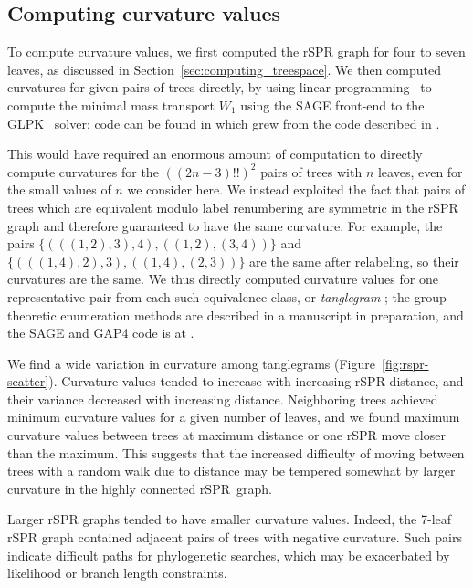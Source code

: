 \documentclass[11pt]{amsart}
\newcommand{\cuttable}[2][]{%
    \ifthenelse{\equal{#1}{}}%
		{}%
		{#1}%
}
\begin{document}
\subsection{Computing curvature values}
To compute curvature values, we first \cuttable[computed]{used \texttt{dense\_spr\_graph} to compute} the rSPR graph for four to seven leaves, as discussed in Section~\ref{sec:computing_treespace}.
We then computed curvatures for given pairs of trees directly, by using linear programming~\cite{Loisel2014-hu} to compute the minimal mass transport $W_1$ using the SAGE \cite{SAGE} front-end to the GLPK~\cite{glpk} solver; code can be found in \cite{gricci} which grew from the code described in \cite{Loisel2014-hu}.

This would have required an enormous amount of computation to directly compute curvatures for the $((2n-3)!!)^2$ pairs of trees with $n$ leaves, even for the small values of $n$ we consider here.
We instead exploited the fact that pairs of trees which are equivalent modulo label renumbering are symmetric in the rSPR graph and therefore guaranteed to have the same curvature.
For example, the pairs
$\{(((1,2),3),4), ((1,2),(3,4))\}$ and
$\{(((1,4),2),3), ((1,4),(2,3))\}$
are the same after relabeling, so their curvatures are the same.
We thus directly computed curvature values for one representative pair from each such equivalence class, or \emph{tanglegram} \cite{Venkatachalam2010-zh}; the group-theoretic enumeration methods are described in a manuscript in preparation, and the SAGE \cite{SAGE} and GAP4 \cite{GAP4} code is at \cite{tangle}.

We find a wide variation in curvature among tanglegrams (Figure~\ref{fig:rspr-scatter}).
Curvature values tended to increase with increasing rSPR distance, and their variance decreased with increasing distance.
Neighboring trees achieved minimum curvature values for a given number of leaves, and we found maximum curvature values between trees at maximum distance or one rSPR move closer than the maximum.
This suggests that the increased difficulty of moving between trees with a random walk due to distance may be tempered somewhat by larger curvature in the highly connected rSPR~graph.

Larger rSPR graphs tended to have smaller curvature values.
Indeed, the 7-leaf rSPR graph contained adjacent pairs of trees with negative curvature.
Such pairs indicate difficult paths for phylogenetic searches, which may be exacerbated by likelihood or branch length constraints.
\end{document}
